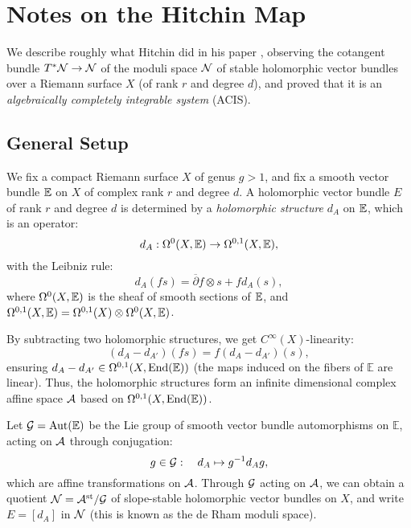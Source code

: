 \section{Notes on the Hitchin Map}
We describe roughly what Hitchin did in his paper \cite{hitch}, observing the cotangent bundle $T^*\mathcal{N}\rightarrow\mathcal{N}$ of the moduli space $\mathcal{N}$ of stable holomorphic vector bundles over a Riemann surface $X$ (of rank $r$ and degree $d$), and proved that it is an \textit{algebraically completely integrable system} (ACIS).


\subsection{General Setup}

We fix a compact Riemann surface $X$ of genus $g>1$, and fix a smooth vector bundle $\mathbb{E}$ on $X$ of complex rank $r$ and degree $d$. A holomorphic vector bundle $E$ of rank $r$ and degree $d$ is determined by a \textit{holomorphic structure} $d_A$ on $\mathbb{E}$, which is an operator:
\begin{equation}
    d_A:\Omega^0(X,\mathbb{E})\rightarrow\Omega^{0,1}(X,\mathbb{E}),
\end{equation}
with the Leibniz rule:
\begin{equation}
    d_A(fs)=\overline{\partial}f\otimes s+fd_A(s),
\end{equation}
where $\Omega^0(X,\mathbb{E})$ is the sheaf of smooth sections of $\mathbb{E}$, and $\Omega^{0,1}(X,\mathbb{E})=\Omega^{0,1}(X)\otimes \Omega^0(X,\mathbb{E})$.

By subtracting two holomorphic structures, we get $C^\infty(X)$-linearity:
\begin{equation}
    (d_A-d_{A'})(fs)=f(d_A-d_{A'})(s),
\end{equation}
ensuring $d_A-d_{A'}\in\Omega^{0,1}(X,\text{End}(\mathbb{E}))$ (the maps induced on the fibers of $\mathbb{E}$ are linear). Thus, the holomorphic structures form an infinite dimensional complex affine space $\mathcal{A}$ based on $\Omega^{0,1}(X,\text{End}(\mathbb{E}))$.

Let $\mathcal{G}=\text{Aut}(\mathbb{E})$ be the Lie group of smooth vector bundle automorphisms on $\mathbb{E}$, acting on $\mathcal{A}$ through conjugation:
\begin{equation}
    g\in\mathcal{G}:\quad d_A\mapsto g^{-1}d_A g,
\end{equation}
which are affine transformations on $\mathcal{A}$. Through $\mathcal{G}$ acting on $\mathcal{A}$, we can obtain a quotient $\mathcal{N}=\mathcal{A}^{\text{st}}/\mathcal{G}$ of slope-stable holomorphic vector bundles on $X$, and write $E=[d_A]$ in $\mathcal{N}$ (this is known as the de Rham moduli space).

